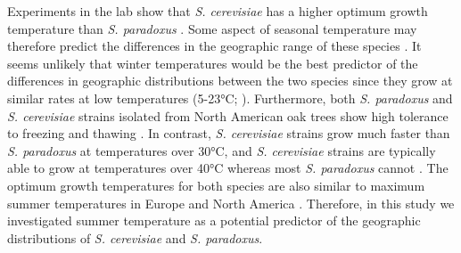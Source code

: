 \documentclass[12pt]{article}
\begin{document}
\begin{linenumbers}
Experiments in the lab show that \textit{S. cerevisiae} has a higher optimum growth temperature than \textit{S. paradoxus} \citep{sweeney_sympatric_2004,salvado_temperature_2011,leducq_local_2014}. Some aspect of seasonal temperature may therefore predict the differences in the geographic range of these species \citep{charron_exploring_2014,leducq_local_2014}. It seems unlikely that winter temperatures would be the best predictor of the differences in geographic distributions between the two species since they grow at similar rates at low temperatures (5-23\si{\degreeCelsius}; \citealp{sweeney_sympatric_2004,salvado_temperature_2011}). Furthermore, both \textit{S. paradoxus} and \textit{S. cerevisiae} strains isolated from North American oak trees show high tolerance to freezing and thawing \citep{will_incipient_2010}. In contrast, \textit{S. cerevisiae} strains grow much faster than \textit{S. paradoxus} at temperatures over 30\si{\degreeCelsius}, and \textit{S. cerevisiae} strains are typically able to grow at temperatures over 40\si{\degreeCelsius} whereas most \textit{S. paradoxus} cannot \citep{liti_population_2009,salvado_temperature_2011}. The optimum growth temperatures for both species \citep{sweeney_sympatric_2004,salvado_temperature_2011} are also similar to maximum summer temperatures in Europe and North America \citep{hijmans_very_2005}. Therefore, in this study we investigated summer temperature as a potential predictor of the geographic distributions of \textit{S. cerevisiae} and \textit{S. paradoxus}.


\end{linenumbers}
\end{document}
